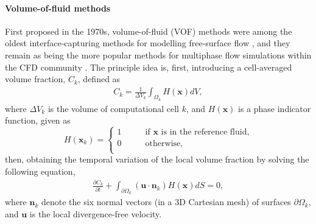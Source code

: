 \medskip
\paragraph{\bf Volume-of-fluid methods}

First proposed in the 1970s, volume-of-fluid (VOF) methods were among the oldest interface-capturing methods for modelling free-surface flow \citep{Debar1974, hirt_nichols_1975, hirt_nichols_1981a}, and they remain as being the more popular methods for multiphase flow simulations within the CFD community \citep{Scardovelli_Zaleski_1999, gerris, pilliod_puckett_2004, xiao_honma_kono_2005a, mthinc2012, paris2019}.
The principle idea is, first, introducing a cell-averaged volume fraction, $C_{k}$, defined as
\begin{equation}
 \begin{aligned}
   C_{k} = \frac{1}{\Delta V_k} \int_{\Omega_k} H(\bm{x}) dV,
 \end{aligned}
\end{equation}
where $\Delta V_k$ is the volume of computational cell $k$, and $H(\bm{x})$ is a phase indicator function, given as
\begin{equation}
    H(\bm{x}_k)=
    \begin{cases}
        1 \quad \quad & \textrm{if $\bm{x}$ is in the reference fluid,} \\
        0 \quad & \textrm{otherwise}, \\
    \end{cases}
\end{equation}
then, obtaining the temporal variation of the local volume fraction by solving the following equation,
\begin{equation} \label{eq:vof-advect}
 \begin{aligned}
   \frac{\partial C_{k}}{\partial t} + \int_{\partial \Omega_k} (\bm{u \cdot n}_k) H(\bm{x}) dS =0,
 \end{aligned}
\end{equation}
where $\bm{n}_k$ denote the six normal vectors (in a 3D Cartesian mesh) of surfaces $\partial \Omega_k$, and $\bm u$ is the local divergence-free velocity.

